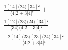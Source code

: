 \documentclass[varwidth, border=5pt]{standalone}
\begin{document}
\begin{my}
$\begin{gathered}
\scriptscriptstyle\frac{1[14]⟨24⟩[34]²}{⟨4|2+3|4]²} +\\
\scriptscriptstyle\frac{1[12]⟨23⟩⟨24⟩[34]²}{⟨34⟩⟨4|2+3|4]²} +\\
\scriptscriptstyle\frac{-2[14]⟨23⟩[23]⟨24⟩[34]²}{⟨4|2+3|4]³} \phantom{+}
\end{gathered}$
\end{my}
\end{document}
